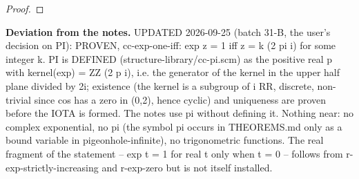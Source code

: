\begin{proof}
%
%
%
\end{proof}
%
\noindent\textbf{Deviation from the notes.} UPDATED 2026-09-25 (batch 31-B, the user's decision on PI): PROVEN, cc-exp-one-iff: exp z = 1 iff z = k (2 pi i) for some integer k. PI is DEFINED (structure-library/cc-pi.scm) as the positive real p with kernel(exp) = ZZ (2 p i), i.e. the generator of the kernel in the upper half plane divided by 2i; existence (the kernel is a subgroup of i RR, discrete, non-trivial since cos has a zero in (0,2), hence cyclic) and uniqueness are proven before the IOTA is formed. The notes use pi without defining it. Nothing near: no complex exponential, no pi (the symbol pi occurs in THEOREMS.md only as a bound variable in pigeonhole-infinite), no trigonometric functions. The real fragment of the statement -- exp t = 1 for real t only when t = 0 -- follows from r-exp-strictly-increasing and r-exp-zero but is not itself installed.
%
\renewcommand{\thethm}{2.19}
